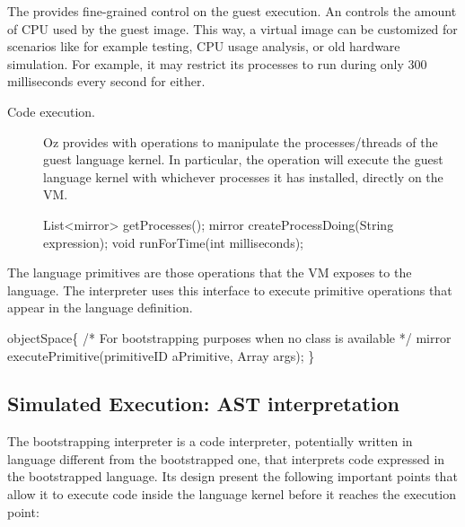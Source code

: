 The \objectspace provides fine-grained control on the guest execution. An \objectspace controls the amount of CPU used by the guest image. This way, a virtual image can be customized for scenarios like for example testing, CPU usage analysis, or old hardware simulation. For example, it may restrict its processes to run during only 300 milliseconds every second for either.

\begin{description}
\item[Code execution.] Oz provides with operations to manipulate the processes/threads of the guest language kernel. In particular, the  operation will execute the guest language kernel with whichever processes it has installed, directly on the VM.
\begin{code}
List<mirror> getProcesses();
mirror createProcessDoing(String expression);
void runForTime(int milliseconds);
\end{code}
\end{description}

The language primitives are those operations that the VM exposes to the language. The interpreter uses this interface to execute primitive operations that appear in the language definition.

\begin{code}
objectSpace\{
    /* For bootstrapping purposes when no class is available */
    mirror executePrimitive(primitiveID aPrimitive, Array args); 
\}
\end{code}



\subsection{Simulated Execution: AST interpretation}

The bootstrapping interpreter is a code interpreter, potentially written in language different from the bootstrapped one, that interprets code expressed in the bootstrapped language. Its design present the following important points that allow it to execute code inside the language kernel before it reaches the execution point:


